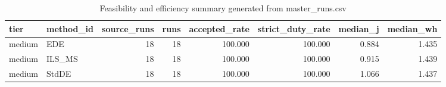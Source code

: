 \begin{table}[!t]
\centering
\caption{Feasibility and efficiency summary generated from master_runs.csv}
\label{tab:feasibility_summary_generated}
\begin{tabular}{llrrrrrr}
\toprule
tier & method_id & source_runs & runs & accepted_rate & strict_duty_rate & median_j & median_wh \\
\midrule
medium & EDE & 18 & 18 & 100.000 & 100.000 & 0.884 & 1.435 \\
medium & ILS_MS & 18 & 18 & 100.000 & 100.000 & 0.915 & 1.439 \\
medium & StdDE & 18 & 18 & 100.000 & 100.000 & 1.066 & 1.437 \\
\bottomrule
\end{tabular}

\end{table}